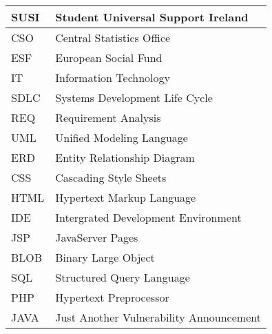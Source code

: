 



\begin{longtable}{p{90pt}l}
\hline SUSI      & Student Universal Support Ireland \\
\hline CSO       & Central Statistics Office \\
\hline ESF       & European Social Fund \\
\hline IT        & Information Technology \\
\hline SDLC      & Systems Development Life Cycle \\
\hline REQ       & Requirement Analysis \\
\hline UML       & Unified Modeling Language \\
\hline ERD       & Entity Relationship Diagram \\
\hline CSS       & Cascading Style Sheets \\
\hline HTML      & Hypertext Markup Language \\
\hline IDE       & Intergrated Development Environment \\
\hline JSP       & JavaServer Pages \\
\hline BLOB      & Binary Large Object \\
\hline SQL       & Structured Query Language \\
\hline PHP       & Hypertext Preprocessor \\
\hline JAVA      & Just Another Vulnerability Announcement \\
\hline
\end{longtable}






